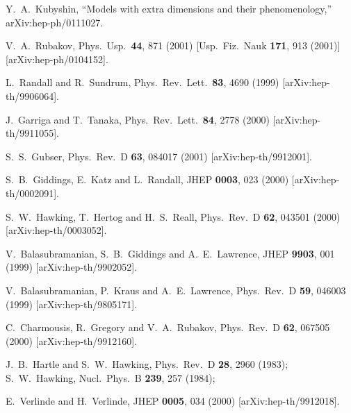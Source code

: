 \documentclass[a4paper,preprint,nofootinbib,
                 showpacs,preprintnumbers,amsmath,amssymb]{revtex4}
\begin{document}
\begin{thebibliography}{99}
Y.~A.~Kubyshin, 
``Models with extra dimensions and their phenomenology,'' 
arXiv:hep-ph/0111027. 

V.~A.~Rubakov, 
Phys.\ Usp.\  {\bf 44}, 871 (2001) 
[Usp.\ Fiz.\ Nauk {\bf 171}, 913 (2001)] 
[arXiv:hep-ph/0104152]. 
 
L.~Randall and R.~Sundrum, 
Phys.\ Rev.\ Lett.\  {\bf 83}, 4690 (1999) 
[arXiv:hep-th/9906064]. 
 

J.~Garriga and T.~Tanaka, 
Phys.\ Rev.\ Lett.\  {\bf 84}, 2778 (2000) 
[arXiv:hep-th/9911055]. 
 
S.~S.~Gubser, 
Phys.\ Rev.\ D {\bf 63}, 084017 (2001) 
[arXiv:hep-th/9912001]. 
 
S.~B.~Giddings, E.~Katz and L.~Randall, 
JHEP {\bf 0003}, 023 (2000) 
[arXiv:hep-th/0002091]. 
 
S.~W.~Hawking, T.~Hertog and H.~S.~Reall, 
Phys.\ Rev.\ D {\bf 62}, 043501 (2000) 
[arXiv:hep-th/0003052]. 
 
V.~Balasubramanian, S.~B.~Giddings and A.~E.~Lawrence, 
JHEP {\bf 9903}, 001 (1999) 
[arXiv:hep-th/9902052]. 
 
V.~Balasubramanian, P.~Kraus and A.~E.~Lawrence, 
Phys.\ Rev.\ D {\bf 59}, 046003 (1999) 
[arXiv:hep-th/9805171]. 

C.~Charmousis, R.~Gregory and V.~A.~Rubakov, 
Phys.\ Rev.\ D {\bf 62}, 067505 (2000) 
[arXiv:hep-th/9912160]. 
 
J.~B.~Hartle and S.~W.~Hawking, 
Phys.\ Rev.\ D {\bf 28}, 2960 (1983); 
S.~W.~Hawking, 
Nucl.\ Phys.\ B {\bf 239}, 257 (1984); 
 
E.~Verlinde and H.~Verlinde, 
JHEP {\bf 0005}, 034 (2000) 
[arXiv:hep-th/9912018]. 
 

\end{thebibliography}
\end{document}
